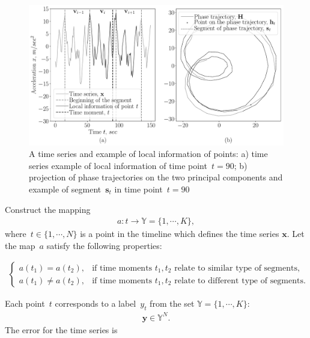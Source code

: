 \documentclass[12pt, twoside]{article}
\numberwithin{equation}{section}
\begin{document}
\begin{figure}[h!t]\center
\includegraphics[width=1\textwidth]{results_eng/statement}
\caption{A time series and example of local information of points:  a) time series example of local information of time point~$t = 90$; b) projection of phase trajectories on the two principal components and example of segment~$\textbf{s}_t$ in time point~$t = 90$}
\label{fig:statement:1}
\end{figure}

Construct the mapping
\begin{equation}
\label{eq:st:4}
\begin{aligned}
a : t \to \mathbb{Y} = \{1,\cdots, K\}, 
\end{aligned}
\end{equation}
where~$t \in \{1,\cdots, N\}$ is a point in the timeline which defines the time series $\textbf{x}$.
Let the map~$a$ satisfy the following properties:

\begin{equation}
\label{eq:st:5}
\begin{aligned}
\begin{cases}
    a\left(t_1\right) = a\left(t_2\right), &  \text{if time moments } t_1, t_2 \text{ relate to similar type of segments,}\\
    a\left(t_1\right) \not= a\left(t_2\right), &  \text{if time moments } t_1, t_2 \text{ relate to different type of segments.}
\end{cases}
\end{aligned}
\end{equation}

Each point~$t$ corresponds to a label~$y_t$ from the set $\mathbb{Y} =  \{1,\cdots,K\}$:
\begin{equation}
\label{eq:st:6}
\begin{aligned}
\textbf{y} \in \mathbb{Y}^{N}.
\end{aligned}
\end{equation}
The error for the time series is
\end{document}
